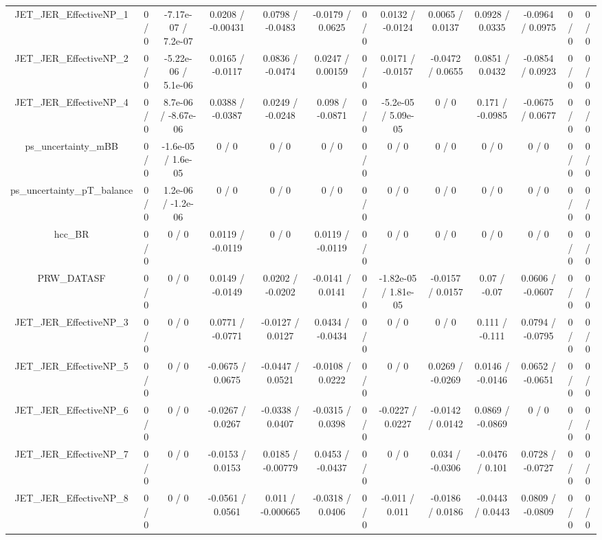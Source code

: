 \documentclass[10pt]{article}
\begin{document}
\begin{table}[htbp]
\begin{center}
\begin{tabular}{|c|c|c|c|c|c|c|c|c|c|c|c|c|}
  JET_JER_EffectiveNP_1 & 0 / 0 & -7.17e-07 / 7.2e-07 & 0.0208 / -0.00431 & 0.0798 / -0.0483 & -0.0179 / 0.0625 & 0 / 0 & 0.0132 / -0.0124 & 0.0065 / 0.0137 & 0.0928 / 0.0335 & -0.0964 / 0.0975 & 0 / 0 & 0 / 0 \\ 
  JET_JER_EffectiveNP_2 & 0 / 0 & -5.22e-06 / 5.1e-06 & 0.0165 / -0.0117 & 0.0836 / -0.0474 & 0.0247 / 0.00159 & 0 / 0 & 0.0171 / -0.0157 & -0.0472 / 0.0655 & 0.0851 / 0.0432 & -0.0854 / 0.0923 & 0 / 0 & 0 / 0 \\ 
  JET_JER_EffectiveNP_4 & 0 / 0 & 8.7e-06 / -8.67e-06 & 0.0388 / -0.0387 & 0.0249 / -0.0248 & 0.098 / -0.0871 & 0 / 0 & -5.2e-05 / 5.09e-05 & 0 / 0 & 0.171 / -0.0985 & -0.0675 / 0.0677 & 0 / 0 & 0 / 0 \\ 
  ps_uncertainty_mBB & 0 / 0 & -1.6e-05 / 1.6e-05 & 0 / 0 & 0 / 0 & 0 / 0 & 0 / 0 & 0 / 0 & 0 / 0 & 0 / 0 & 0 / 0 & 0 / 0 & 0 / 0 \\ 
  ps_uncertainty_pT_balance & 0 / 0 & 1.2e-06 / -1.2e-06 & 0 / 0 & 0 / 0 & 0 / 0 & 0 / 0 & 0 / 0 & 0 / 0 & 0 / 0 & 0 / 0 & 0 / 0 & 0 / 0 \\ 
  hcc_BR & 0 / 0 & 0 / 0 & 0.0119 / -0.0119 & 0 / 0 & 0.0119 / -0.0119 & 0 / 0 & 0 / 0 & 0 / 0 & 0 / 0 & 0 / 0 & 0 / 0 & 0 / 0 \\ 
  PRW_DATASF & 0 / 0 & 0 / 0 & 0.0149 / -0.0149 & 0.0202 / -0.0202 & -0.0141 / 0.0141 & 0 / 0 & -1.82e-05 / 1.81e-05 & -0.0157 / 0.0157 & 0.07 / -0.07 & 0.0606 / -0.0607 & 0 / 0 & 0 / 0 \\ 
  JET_JER_EffectiveNP_3 & 0 / 0 & 0 / 0 & 0.0771 / -0.0771 & -0.0127 / 0.0127 & 0.0434 / -0.0434 & 0 / 0 & 0 / 0 & 0 / 0 & 0.111 / -0.111 & 0.0794 / -0.0795 & 0 / 0 & 0 / 0 \\ 
  JET_JER_EffectiveNP_5 & 0 / 0 & 0 / 0 & -0.0675 / 0.0675 & -0.0447 / 0.0521 & -0.0108 / 0.0222 & 0 / 0 & 0 / 0 & 0.0269 / -0.0269 & 0.0146 / -0.0146 & 0.0652 / -0.0651 & 0 / 0 & 0 / 0 \\ 
  JET_JER_EffectiveNP_6 & 0 / 0 & 0 / 0 & -0.0267 / 0.0267 & -0.0338 / 0.0407 & -0.0315 / 0.0398 & 0 / 0 & -0.0227 / 0.0227 & -0.0142 / 0.0142 & 0.0869 / -0.0869 & 0 / 0 & 0 / 0 & 0 / 0 \\ 
  JET_JER_EffectiveNP_7 & 0 / 0 & 0 / 0 & -0.0153 / 0.0153 & 0.0185 / -0.00779 & 0.0453 / -0.0437 & 0 / 0 & 0 / 0 & 0.034 / -0.0306 & -0.0476 / 0.101 & 0.0728 / -0.0727 & 0 / 0 & 0 / 0 \\ 
  JET_JER_EffectiveNP_8 & 0 / 0 & 0 / 0 & -0.0561 / 0.0561 & 0.011 / -0.000665 & -0.0318 / 0.0406 & 0 / 0 & -0.011 / 0.011 & -0.0186 / 0.0186 & -0.0443 / 0.0443 & 0.0809 / -0.0809 & 0 / 0 & 0 / 0 \\ 

\end{tabular}
\end{center}
\end{table}
\end{document}
